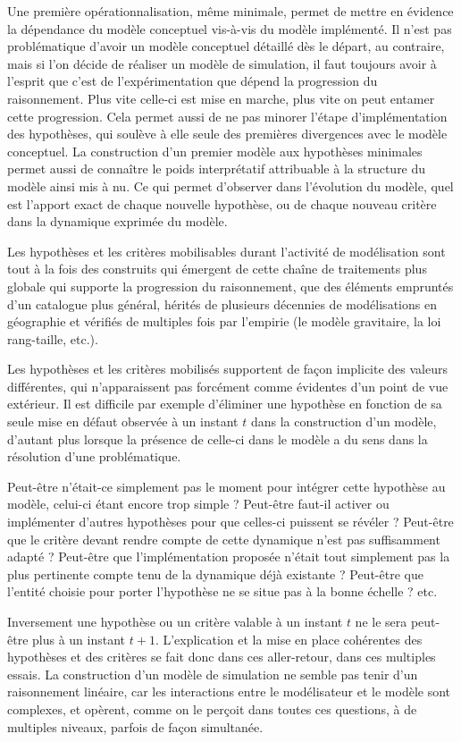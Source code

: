 Une première opérationnalisation, même minimale, permet de mettre en évidence la dépendance du modèle conceptuel vis-à-vis du modèle implémenté. Il n'est pas problématique d'avoir un modèle conceptuel détaillé dès le départ, au contraire, mais si l'on décide de réaliser un modèle de simulation, il faut toujours avoir à l'esprit que c'est de l'expérimentation que dépend la progression du raisonnement. Plus vite celle-ci est mise en marche, plus vite on peut entamer cette progression. Cela permet aussi de ne pas minorer l'étape d'implémentation des hypothèses, qui soulève à elle seule des premières divergences avec le modèle conceptuel. La construction d'un premier modèle aux hypothèses minimales permet aussi de connaître le poids interprétatif attribuable à la structure du modèle ainsi mis à nu. Ce qui permet d’observer dans l’évolution du modèle, quel est l’apport exact de chaque nouvelle hypothèse, ou de chaque nouveau critère dans la dynamique exprimée du modèle.

Les hypothèses et les critères mobilisables durant l'activité de modélisation sont tout à la fois des construits qui émergent de cette chaîne de traitements plus globale qui supporte la progression du raisonnement, que des éléments empruntés d'un catalogue plus général, hérités de plusieurs décennies de modélisations en géographie et vérifiés de multiples fois par l'empirie (le modèle gravitaire, la loi rang-taille, etc.).

Les hypothèses et les critères mobilisés supportent de façon implicite des valeurs différentes, qui n'apparaissent pas forcément comme évidentes d'un point de vue extérieur. Il est difficile par exemple d'éliminer une hypothèse en fonction de sa seule mise en défaut observée à un instant $t$ dans la construction d'un modèle, d'autant plus lorsque la présence de celle-ci dans le modèle a du sens dans la résolution d'une problématique.

Peut-être n'était-ce simplement pas le moment pour intégrer cette hypothèse au modèle, celui-ci étant encore trop simple ? Peut-être faut-il activer ou implémenter d'autres hypothèses pour que celles-ci puissent se révéler ? Peut-être que le critère devant rendre compte de cette dynamique n'est pas suffisamment adapté ? Peut-être que l'implémentation proposée n'était tout simplement pas la plus pertinente compte tenu de la dynamique déjà existante ? Peut-être que l'entité choisie pour porter l'hypothèse ne se situe pas à la bonne échelle ? etc.

Inversement une hypothèse ou un critère valable à un instant $t$ ne le sera peut-être plus à un instant $t + 1$. L'explication et la mise en place cohérentes des hypothèses et des critères se fait donc dans ces aller-retour, dans ces multiples essais. La construction d'un modèle de simulation ne semble pas tenir d'un raisonnement linéaire, car les interactions entre le modélisateur et le modèle sont complexes, et opèrent, comme on le perçoit dans toutes ces questions, à de multiples niveaux, parfois de façon simultanée.

